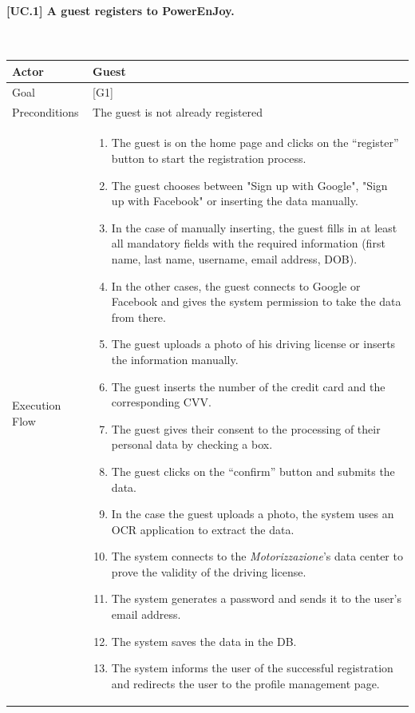 \documentclass[english]{article}
\begin{document}
	\paragraph{[UC.1] A guest registers to PowerEnJoy.}
	~\\
	\begin{tabularx}{\textwidth}{  l  X  }
		\hline
		Actor & Guest\\
		\hline
		Goal & [G1]\\
		\hline
		Preconditions & The guest is not already registered\\
		\hline
		Execution Flow & \begin{enumerate}
			\item{The guest is on the home page and clicks on the “register” button to start the registration process.}
			\item{The guest chooses between "Sign up with Google", "Sign up with Facebook" or inserting the data manually.}
			\item{In the case of manually inserting, the guest fills in at least all mandatory fields with the required information (first name, last name, username, email address, DOB).}
			\item{In the other cases, the guest connects to Google or Facebook and gives the system permission to take the data from there.}
			\item{The guest uploads a photo of his driving license or inserts the information manually.}
			\item{The guest inserts the number of the credit card and the corresponding CVV}.
			\item{The guest gives their consent to the processing of their personal data by checking a box.}
			\item{The guest clicks on the “confirm” button and submits the data.}
      \item{In the case the guest uploads a photo, the system uses an OCR application to extract the data.}
      \item{The system connects to the \textit{Motorizzazione}'s data center to prove the validity of the driving license.}
			\item{The system generates a password and sends it to the user's email address.}
			\item{The system  saves the data in the DB.}
			\item{The system informs the user of the successful registration and redirects the user to the profile management page.}
		\end{enumerate}\\
		\hline
	\end{tabularx}
\end{document}
